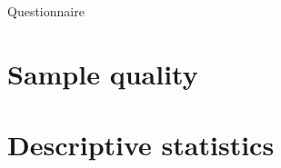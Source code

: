 \begin{frame}{Questionnaire}
\end{frame}

\section{Sample quality}

\begin{table}%
	\begin{center}
		\scalebox{0.7}{}
	\end{center}
\end{table}	

\section{Descriptive statistics}



